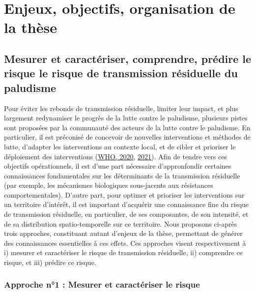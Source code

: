 \documentclass[12pt,twoside]{reedthesis}
\begin{document}
\hypertarget{enjeux-objectifs-these}{%
\section{Enjeux, objectifs, organisation de la thèse}\label{enjeux-objectifs-these}}

\hypertarget{mesurer-et-caractuxe9riser-comprendre-pruxe9dire-le-risque-le-risque-de-transmission-ruxe9siduelle-du-paludisme}{%
\subsection{Mesurer et caractériser, comprendre, prédire le risque le risque de transmission résiduelle du paludisme}\label{mesurer-et-caractuxe9riser-comprendre-pruxe9dire-le-risque-le-risque-de-transmission-ruxe9siduelle-du-paludisme}}

Pour éviter les rebonds de transmission résiduelle, limiter leur impact, et plus largement redynamiser le progrès de la lutte contre le paludisme, plusieurs pistes sont proposées par la communauté des acteurs de la lutte contre le paludisme. En particulier, il est préconisé de concevoir de nouvelles interventions et méthodes de lutte, d'adapter les interventions au contexte local, et de cibler et prioriser le déploiement des interventions (\protect\hyperlink{ref-who_2020_world_nodate}{WHO, 2020}, \protect\hyperlink{ref-who_2021}{2021}). Afin de tendre vers ces objectifs opérationnels, il est d'une part nécessaire d'appronfondir certaines connaissances fondamentales sur les déterminants de la transmission résiduelle (par exemple, les mécanismes biologiques sous-jacents aux résistances comportementales). D'autre part, pour optimer et prioriser les interventions sur un territoire d'intérêt, il est important d'acquérir une connaissance fine du risque de transmission résiduelle, en particulier, de ses composantes, de son intensité, et de sa distribution spatio-temporelle sur ce territoire. Nous proposons ci-après trois approches, constituant autant d'enjeux de la thèse, permettant de générer des connaissances essentielles à ces effets. Ces approches visent respectivement à i) mesurer et caractériser le risque de transmission résiduelle, ii) comprendre ce risque, et iii) prédire ce risque.

\hypertarget{measure-risk}{%
\subsubsection{Approche n°1 : Mesurer et caractériser le risque}\label{measure-risk}}
\end{document}
